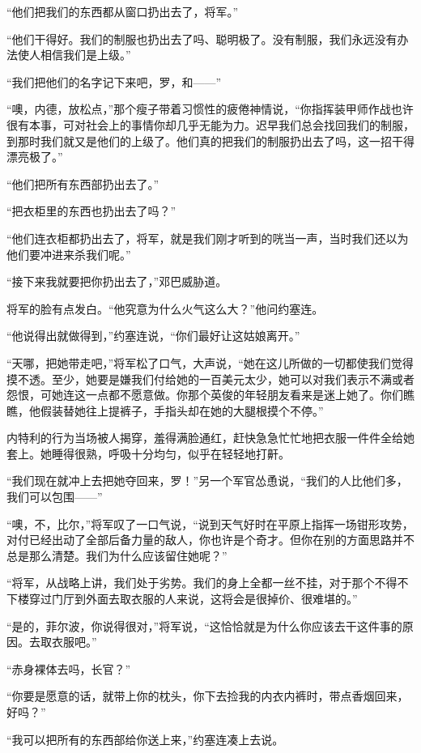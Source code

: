     “他们把我们的东西都从窗口扔出去了，将军。”

    “他们干得好。我们的制服也扔出去了吗、聪明极了。没有制服，我们永远没有办法使人相信我们是上级。”

    “我们把他们的名字记下来吧，罗，和——”

    “噢，内德，放松点，”那个瘦子带着习惯性的疲倦神情说，“你指挥装甲师作战也许很有本事，可对社会上的事情你却几乎无能为力。迟早我们总会找回我们的制服，到那时我们就又是他们的上级了。他们真的把我们的制服扔出去了吗，这一招干得漂亮极了。”

    “他们把所有东西部扔出去了。”

    “把衣柜里的东西也扔出去了吗？”

    “他们连衣柜都扔出去了，将军，就是我们刚才听到的咣当一声，当时我们还以为他们要冲进来杀我们呢。”

    “接下来我就要把你扔出去了，”邓巴威胁道。

    将军的脸有点发白。“他究意为什么火气这么大？”他问约塞连。

    “他说得出就做得到，”约塞连说，“你们最好让这姑娘离开。”

    “天哪，把她带走吧，”将军松了口气，大声说，“她在这儿所做的一切都使我们觉得摸不透。至少，她要是嫌我们付给她的一百美元太少，她可以对我们表示不满或者怨恨，可她连这一点都不愿意做。你那个英俊的年轻朋友看来是迷上她了。你们瞧瞧，他假装替她往上提裤子，手指头却在她的大腿根摸个不停。”

    内特利的行为当场被人揭穿，羞得满脸通红，赶快急急忙忙地把衣服一件件全给她套上。她睡得很熟，呼吸十分均匀，似乎在轻轻地打鼾。

    “我们现在就冲上去把她夺回来，罗！”另一个军官怂恿说，“我们的人比他们多，我们可以包围——”

    “噢，不，比尔，”将军叹了一口气说，“说到天气好时在平原上指挥一场钳形攻势，对付已经出动了全部后备力量的敌人，你也许是个奇才。但你在别的方面思路并不总是那么清楚。我们为什么应该留住她呢？”

    “将军，从战略上讲，我们处于劣势。我们的身上全都一丝不挂，对于那个不得不下楼穿过门厅到外面去取衣服的人来说，这将会是很掉价、很难堪的。”

    “是的，菲尔波，你说得很对，”将军说，“这恰恰就是为什么你应该去干这件事的原因。去取衣服吧。”

    “赤身裸体去吗，长官？”

    “你要是愿意的话，就带上你的枕头，你下去捡我的内衣内裤时，带点香烟回来，好吗？”

    “我可以把所有的东西部给你送上来，”约塞连凑上去说。


